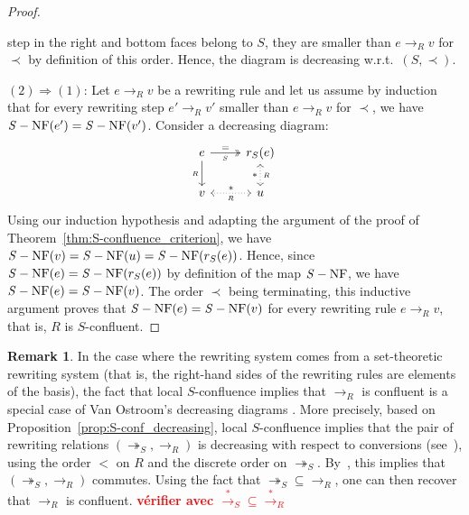\documentclass[11pt]{article}
\theoremstyle{definition}
\newtheorem{remark}[theorem]{Remark}
\newcommand\todo[1]{{\bf\textcolor{red}{#1}}}
\newcommand\rewR{\to_R}
\newcommand\parS{\twoheadrightarrow_S}
\newcommand\transR{\overset{*}{\to}_R}
\newcommand\transS{\overset{*}{\to}_S}
\DeclareMathOperator{\SNF}{{\it S}-NF}
\begin{document}
\begin{proof}
\begin{itemize}
    step in the right and bottom faces belong to $S$, they are smaller
    than $e\rewR v$ for $\prec$ by definition of this order. Hence, the
    diagram is decreasing w.r.t.\ $(S,\prec)$. 
  \end{itemize}
  $(2)\Rightarrow (1)$: Let $e\rewR v$ be a rewriting rule and let us
  assume by induction that for every rewriting step $e'\rewR v'$ smaller
  than $e\rewR v$ for $\prec$, we have $\SNF(e')=\SNF(v')$. Consider a
  decreasing diagram:
  \[\begin{tikzcd}
  e\ar[d, "_R"']\ar[r, twoheadrightarrow, "=", "_S"'] &
  r_S(e)\ar[d, leftrightarrow, dotted, "*"', "_R"]\\
  v\ar[r, leftrightarrow, dotted, "*", "_R"'] & u
  \end{tikzcd}\]
  Using our induction hypothesis and adapting the argument of the proof
  of Theorem~\ref{thm:S-confluence_criterion}, we have 
  $\SNF(v)=\SNF(u)=\SNF(r_S(e))$. Hence, since $\SNF(e)=\SNF(r_S(e))$ by
  definition of the map $\SNF$, we have $\SNF(e)=\SNF(v)$. The order
  $\prec$ being terminating, this inductive argument proves that
  $\SNF(e)=\SNF(v)$ for every rewriting rule $e\rewR v$, that is, $R$ is
  $S$-confluent.
\end{proof}
\smallskip

\begin{remark}
  In the case where the rewriting system comes from a set-theoretic rewriting
  system (that is, the right-hand sides of the rewriting rules are elements of
  the basis), the fact that local $S$-confluence implies that $\rewR$ is
  confluent is a special case of Van Ostroom's decreasing diagrams
  \cite{van2008confluence}. More precisely, based on
  Proposition~\ref{prop:S-conf_decreasing}, local $S$-confluence implies
  that the pair of rewriting relations $(\parS,\rewR)$ is decreasing with
  respect to conversions (see~\cite[Definition 3]{van2008confluence}),
  using the order $<$ on $R$ and the discrete order on $\parS$.
  By~\cite[Theorem 3]{van2008confluence}, this implies that
  $(\parS,\rewR)$ commutes. Using the fact that $\parS \subseteq \rewR$,
  one can then recover that $\rewR$ is confluent. \todo{vérifier avec
  $\transS\subseteq\transR$}
\end{remark}
\smallskip
\end{document}

